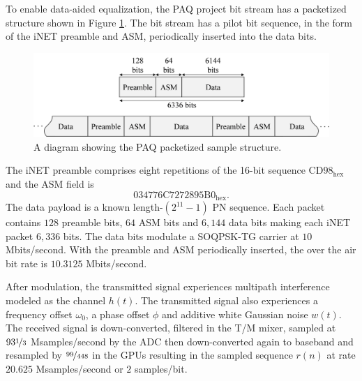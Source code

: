 To enable data-aided equalization, the PAQ project bit stream has a packetized structure shown in Figure \ref{fig:packetStructure_intro}.
The bit stream has a pilot bit sequence, in the form of the iNET preamble and ASM, periodically inserted into the data bits.
\begin{figure}
	\centering\includegraphics[width=9.47in/100*55]{figures/intro/packetSturcture.pdf}
	\caption{A diagram showing the PAQ packetized sample structure.}
	\label{fig:packetStructure_intro}
\end{figure}
The iNET preamble comprises eight repetitions of the 16-bit sequence $\text{CD98}_\text{hex}$ and the ASM field is
\begin{equation}
\text{034776C7272895B0}_\text{hex}.
\end{equation}
The data payload is a known length-$(2^{11} - 1)$ PN sequence.
Each packet contains $128$ preamble bits, $64$ ASM bits and $6{,}144$ data bits making each iNET packet $6{,}336$ bits.
The data bits modulate a SOQPSK-TG carrier at $10$ Mbits/second.
With the preamble and ASM periodically inserted, the over the air bit rate is $10.3125$ Mbits/second.

After modulation, the transmitted signal experiences multipath interference modeled as the channel $h(t)$.
The transmitted signal also experiences a frequency offset $\omega_0$, a phase offset $\phi$ and additive white Gaussian noise $w(t)$.
The received signal is down-converted, filtered in the T/M mixer, sampled at $93\nicefrac{1}{3}$ Msamples/second by the ADC then down-converted again to baseband and resampled by $\nicefrac{99}{448}$ in the GPUs resulting in the sampled sequence $r(n)$ at rate $20.625$ Msamples/second or $2$ samples/bit.

